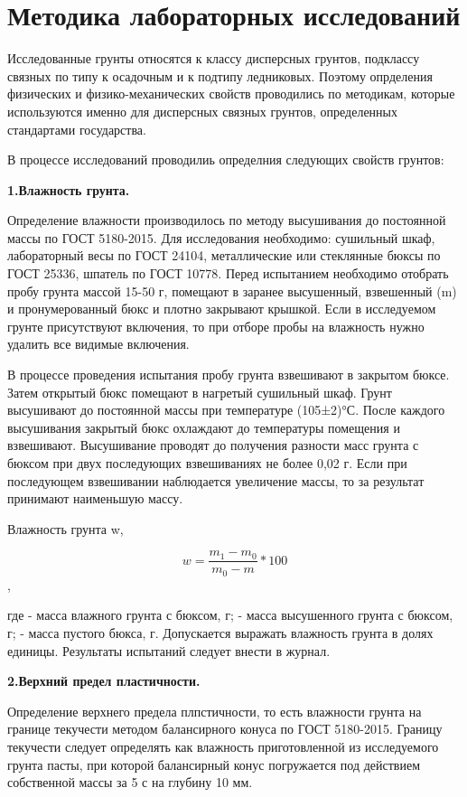 \chapter*{Методика лабораторных исследований}

Исследованные грунты относятся к классу дисперсных грунтов, подклассу связных по типу 
к осадочным и к подтипу ледниковых. 
Поэтому опрделения физических и физико-механических свойств проводились по методикам, 
которые используются именно для дисперсных связных грунтов, определенных 
стандартами государства.

В процессе исследований проводилиь определния следующих свойств грунтов:

\textbf{1.Влажность грунта.}

Определение влажности производилось по методу высушивания до постоянной массы по ГОСТ 5180-2015. 
Для исследования необходимо: сушильный шкаф, лабораторный весы по ГОСТ 24104, 
металлические или стеклянные бюксы по ГОСТ 25336, шпатель по ГОСТ 10778. 
Перед испытанием необходимо отобрать пробу грунта массой 15-50 г, 
помещают в заранее высушенный, взвешенный (m) и пронумерованный бюкс и плотно закрывают крышкой. 
Если в исследуемом грунте присутствуют включения, 
то при отборе пробы на влажность нужно удалить все видимые включения.

В процессе проведения испытания пробу грунта взвешивают в закрытом бюксе. Затем открытый бюкс 
помещают в нагретый сушильный шкаф. Грунт
высушивают до постоянной массы при температуре (105±2)°С. После каждого высушивания закрытый бюкс 
охлаждают до температуры помещения и взвешивают.
Высушивание проводят до получения разности масс грунта с бюксом при двух последующих взвешиваниях 
не более 0,02 г. Если при последующем взвешивании 
наблюдается увеличение массы, то за результат принимают наименьшую массу.

Влажность грунта w, %

\[
   w = \frac{m_1-m_0}{m_0-m}*100
\]
,

где - масса влажного грунта с бюксом, г;
- масса высушенного грунта с бюксом, г;
- масса пустого бюкса, г.
Допускается выражать влажность грунта в долях единицы.
Результаты испытаний следует внести в журнал.

\textbf{2.Верхний предел пластичности.}

Определение верхнего предела плпстичности, то есть влажности грунта на границе текучести 
методом балансирного конуса по ГОСТ 5180-2015.
Границу текучести следует определять как влажность приготовленной из исследуемого грунта пасты, 
при которой балансирный конус погружается
под действием собственной массы за 5 с на глубину 10 мм.


